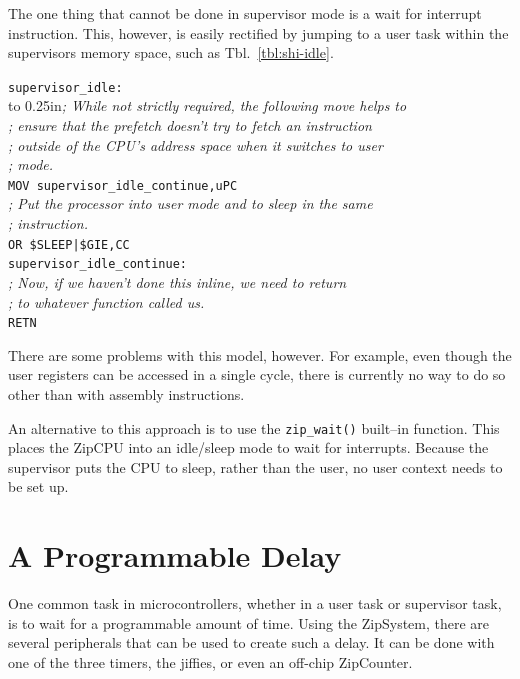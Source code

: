 \documentclass{gqtekspec}
\begin{document}
The one thing that cannot be done in supervisor mode is a wait for interrupt
instruction.  This, however, is easily rectified by jumping to a user task
within the supervisors memory space, such as Tbl.~\ref{tbl:shi-idle}.
\begin{table}\begin{center}
\begin{tabbing}
{\tt supervisor\_idle:} \\
\hbox to 0.25in{}\={\em ; While not strictly required, the following move helps to} \\
\>	{\em ; ensure that the prefetch doesn't try to fetch an instruction} \\
\>	{\em ; outside of the CPU's address space when it switches to user} \\
\>	{\em ; mode.} \\
\>	{\tt MOV supervisor\_idle\_continue,uPC} \\
\>	{\em ; Put the processor into user mode and to sleep in the same} \\
\>	{\em ; instruction. } \\
\>	{\tt OR \$SLEEP|\$GIE,CC} \\
{\tt supervisor\_idle\_continue:} \\
\>	{\em ; Now, if we haven't done this inline, we need to return} \\
\>	{\em ; to whatever function called us.} \\
\>	{\tt RETN} \\
\end{tabbing}
\caption{Executing an idle from supervisor mode}\label{tbl:shi-idle}
\end{center}\end{table}

There are some problems with this model, however.  For example, even though
the user registers can be accessed in a single cycle, there is currently
no way to do so other than with assembly instructions.

An alternative to this approach is to use the {\tt zip\_wait()} built--in
function.  This places the ZipCPU into an idle/sleep mode to wait for
interrupts.  Because the supervisor puts the CPU to sleep, rather than the
user, no user context needs to be set up.

\section{A Programmable Delay}

One common task in microcontrollers, whether in a user task or supervisor
task, is to wait for a programmable amount of time.  Using the ZipSystem,
there are several peripherals that can be used to create such a delay.
It can be done with one of the three timers, the jiffies, or even an off-chip
ZipCounter.
\end{document}
